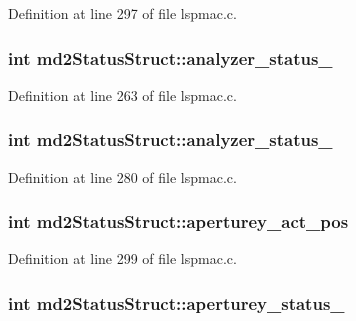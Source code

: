 Definition at line 297 of file lspmac.\-c.

\hypertarget{structmd2StatusStruct_ab876b484f55bcce576fcd89dcc3f7267}{
\subsubsection[{analyzer\-\_\-status\-\_\-1}]{\setlength{\rightskip}{0pt plus 5cm}int md2\-Status\-Struct\-::analyzer\-\_\-status\-\_}}\label{structmd2StatusStruct_ab876b484f55bcce576fcd89dcc3f7267}


Definition at line 263 of file lspmac.\-c.

\hypertarget{structmd2StatusStruct_a4f88bb778e4e18f1fbf7672ac11e7433}{
\subsubsection[{analyzer\-\_\-status\-\_\-2}]{\setlength{\rightskip}{0pt plus 5cm}int md2\-Status\-Struct\-::analyzer\-\_\-status\-\_}}\label{structmd2StatusStruct_a4f88bb778e4e18f1fbf7672ac11e7433}


Definition at line 280 of file lspmac.\-c.

\hypertarget{structmd2StatusStruct_a2a434d2b57dbb669de0765486a1516ff}{
\subsubsection[{aperturey\-\_\-act\-\_\-pos}]{\setlength{\rightskip}{0pt plus 5cm}int md2\-Status\-Struct\-::aperturey\-\_\-act\-\_\-pos}}\label{structmd2StatusStruct_a2a434d2b57dbb669de0765486a1516ff}


Definition at line 299 of file lspmac.\-c.

\hypertarget{structmd2StatusStruct_a2ef953eaddf7058bf4276585e6ff066b}{
\subsubsection[{aperturey\-\_\-status\-\_\-1}]{\setlength{\rightskip}{0pt plus 5cm}int md2\-Status\-Struct\-::aperturey\-\_\-status\-\_}}\label{structmd2StatusStruct_a2ef953eaddf7058bf4276585e6ff066b}


